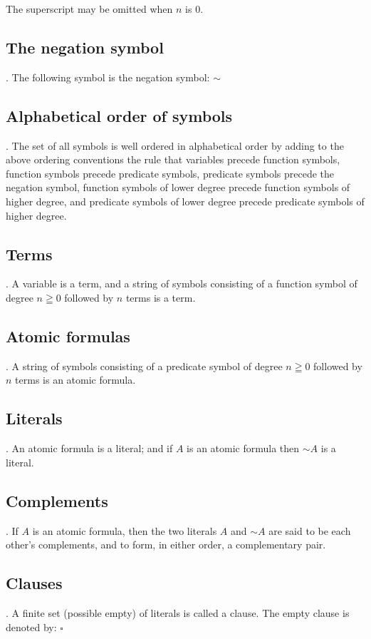 \documentclass[8pt]{extarticle}
\begin{document}
\noindent The superscript may be omitted when $n$ is 0.

\subsection{The negation symbol}. The following symbol is the negation symbol: $\sim$

\subsection{Alphabetical order of symbols}. The set of all symbols is well ordered in alphabetical order by adding to the above ordering conventions the rule that variables precede function symbols, function symbols precede predicate symbols, predicate symbols precede the negation symbol, function symbols of lower degree precede function symbols of higher degree, and predicate symbols of lower degree precede predicate symbols of higher degree.

\subsection{Terms}. A variable is a term, and a string of symbols consisting of a function symbol of degree $n\geqq0$ followed by $n$ terms is a term.

\subsection{Atomic formulas}. A string of symbols consisting of a predicate symbol of degree $n\geqq0$ followed by $n$ terms is an atomic formula.

\subsection{Literals}. An atomic formula is a literal; and if $A$ is an atomic formula then $\sim A$ is a literal.

\subsection{Complements}. If $A$ is an atomic formula, then the two literals $A$ and $\sim A$ are said to be each other's complements, and to form, in either order, a complementary pair.

\subsection{Clauses}. A finite set (possible empty) of literals is called a clause. The empty clause is denoted by: $\square$
\end{document}
